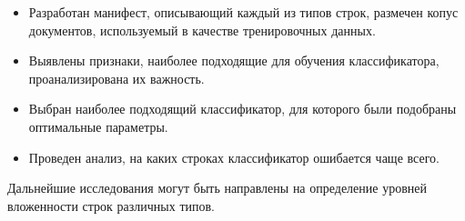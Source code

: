 \documentclass[a4paper,12pt]{article}
\begin{document}
\begin{itemize}

\item Разработан манифест, описывающий каждый из типов строк, размечен копус документов, используемый в качестве тренировочных данных.

\item Выявлены признаки, наиболее подходящие для обучения классификатора, проанализирована их важность. 

\item Выбран наиболее подходящий классификатор, для которого были подобраны оптимальные параметры.

\item Проведен анализ, на каких строках классификатор ошибается чаще всего.

\end{itemize}

Дальнейшие исследования могут быть направлены на определение уровней вложенности строк различных типов.

\newpage
 
\end{document}
